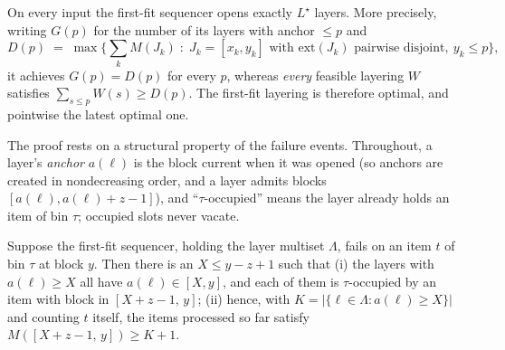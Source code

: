 \begin{theorem}
\label{thm:greedy}
On every input the first-fit sequencer opens exactly $L^\star$ layers.
More precisely, writing $G(p)$ for the number of its layers with anchor
$\le p$ and
\[
  D(p) \;=\; \max\Big\{ \textstyle\sum_{k} M(J_k) \;:\;
     J_k = [x_k, y_k] \text{ with } \mathrm{ext}(J_k)
     \text{ pairwise disjoint},\ y_k \le p \Big\},
\]
it achieves $G(p) = D(p)$ for every $p$, whereas \emph{every} feasible
layering $W$ satisfies $\sum_{s \le p} W(s) \ge D(p)$. The first-fit layering
is therefore optimal, and pointwise the latest optimal one.
\end{theorem}

The proof rests on a structural property of the failure events. Throughout,
a layer's \emph{anchor} $a(\ell)$ is the block current when it was opened (so
anchors are created in nondecreasing order, and a layer admits blocks
$[a(\ell), a(\ell)+z-1]$), and ``$\tau$-occupied'' means the layer already
holds an item of bin $\tau$; occupied slots never vacate.

\begin{lemma}
\label{lem:blocking}
Suppose the first-fit sequencer, holding the layer multiset $\Lambda$, fails
on an item $t$ of bin $\tau$ at block $y$. Then there is an
$X \le y - z + 1$ such that
(i) the layers with $a(\ell) \ge X$ all have $a(\ell) \in [X, y]$, and each
of them is $\tau$-occupied by an item with block in $[X + z - 1,\, y]$;
(ii) hence, with $K = |\{\ell \in \Lambda : a(\ell) \ge X\}|$ and counting
$t$ itself, the items processed so far satisfy
$M([X + z - 1,\, y]) \ge K + 1$.
\end{lemma}

